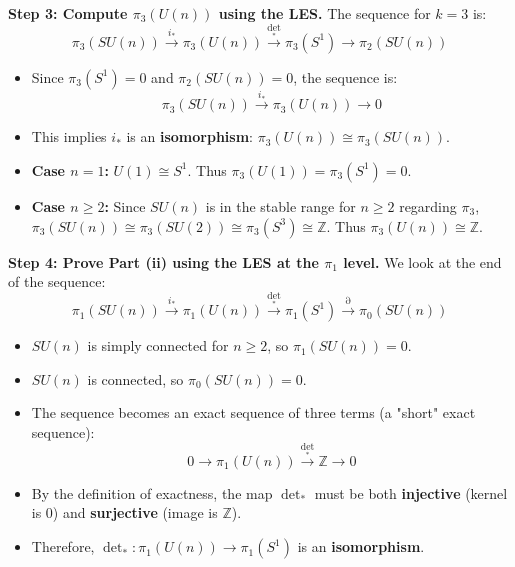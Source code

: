 \begin{solution}
\textbf{Step 3: Compute $\pi_3(U(n))$ using the LES.}
The sequence for $k=3$ is:
\[ \pi_3(SU(n)) \xrightarrow{i_*} \pi_3(U(n)) \xrightarrow{\det_*} \pi_3(S^1) \to \pi_2(SU(n)) \]
\begin{itemize}
    \item Since $\pi_3(S^1) = 0$ and $\pi_2(SU(n)) = 0$, the sequence is:
    \[ \pi_3(SU(n)) \xrightarrow{i_*} \pi_3(U(n)) \to 0 \]
    \item This implies $i_*$ is an \textbf{isomorphism}: $\pi_3(U(n)) \cong \pi_3(SU(n))$.
    \item \textbf{Case $n=1$:} $U(1) \cong S^1$. Thus $\pi_3(U(1)) = \pi_3(S^1) = 0$.
    \item \textbf{Case $n \geq 2$:} Since $SU(n)$ is in the stable range for $n \geq 2$ regarding $\pi_3$, $\pi_3(SU(n)) \cong \pi_3(SU(2)) \cong \pi_3(S^3) \cong \mathbb{Z}$. Thus \textbf{$\pi_3(U(n)) \cong \mathbb{Z}$}.
\end{itemize}

\textbf{Step 4: Prove Part (ii) using the LES at the $\pi_1$ level.}
We look at the end of the sequence:
\[ \pi_1(SU(n)) \xrightarrow{i_*} \pi_1(U(n)) \xrightarrow{\det_*} \pi_1(S^1) \xrightarrow{\partial} \pi_0(SU(n)) \]
\begin{itemize}
    \item $SU(n)$ is simply connected for $n \geq 2$, so $\pi_1(SU(n)) = 0$.
    \item $SU(n)$ is connected, so $\pi_0(SU(n)) = 0$.
    \item The sequence becomes an exact sequence of three terms (a "short" exact sequence):
    \[ 0 \to \pi_1(U(n)) \xrightarrow{\det_*} \mathbb{Z} \to 0 \]
    \item By the definition of exactness, the map $\det_*$ must be both \textbf{injective} (kernel is 0) and \textbf{surjective} (image is $\mathbb{Z}$).
    \item Therefore, $\det_* : \pi_1(U(n)) \to \pi_1(S^1)$ is an \textbf{isomorphism}.
\end{itemize}


\end{solution}
